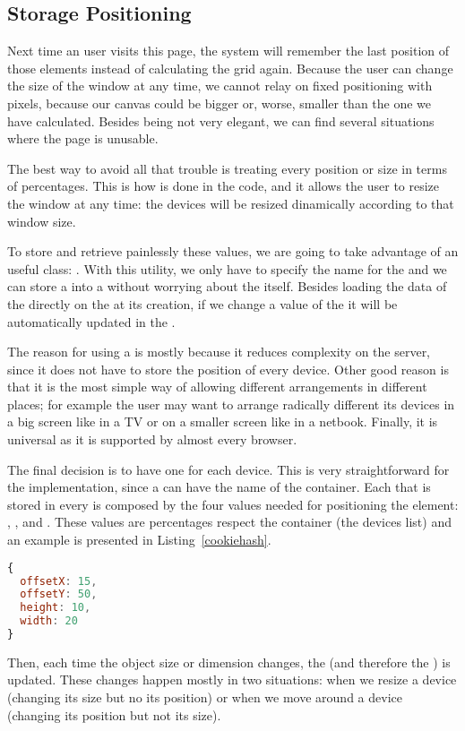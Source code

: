 \subsection{Storage Positioning}

Next time an user visits this page, the system will remember the last position
of those elements instead of calculating the grid again. Because the user can
change the size of the window at any time, we cannot relay on fixed
positioning with pixels, because our canvas could be bigger or, worse, smaller
than the one we have calculated. Besides being not very elegant, we can find
several situations where the page is unusable.

The best way to avoid all that trouble is treating every position or size in
terms of percentages. This is how is done in the code, and it allows the user
to resize the window at any time: the devices will be resized dinamically
according to that window size.

To store and retrieve painlessly these values, we are going to take advantage
of an useful  class:  \cite{MooHashCookie}.
With this utility, we only have to specify the name for the  and
we can store a  into a  without worrying about the
 itself.
Besides loading the data of the  directly on the  at its
creation, if we change a value of the  it will be automatically
updated in the .

The reason for using a  is mostly because it reduces complexity on
the server, since it does not have to store the position of every device.
Other good reason is that it is the most simple way of allowing different
arrangements in different places; for example the user may want to arrange
radically different its devices in a big screen like in a TV or on a smaller
screen like in a netbook. Finally, it is universal as it is supported by
almost every browser.

The final decision is to have one  for each device.
This is very straightforward for the implementation, since a  can
have the name of the container.
Each  that is stored in every  is composed by the four
values needed for positioning the element: , ,
 and .
These values are percentages respect the container (the devices list) and an
 example is presented in Listing~\ref{cookiehash}.

\begin{lstlisting}[language=JavaScript,label=cookiehash,
  caption=Cookie Hash example]
{
  offsetX: 15,
  offsetY: 50,
  height: 10,
  width: 20
}
\end{lstlisting}

Then, each time the object size or dimension changes, the  (and
therefore the ) is updated. These changes happen mostly in two
situations: when we resize a device (changing its size but no its position) or
when we move around a device (changing its position but not its size).
